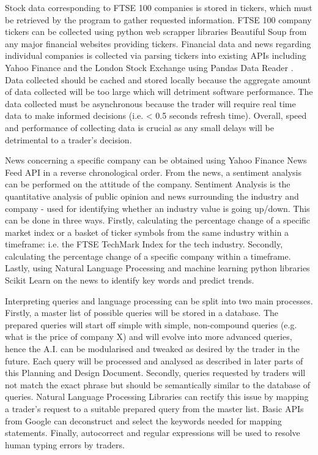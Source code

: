 \documentclass[]{IEEEtran}
\begin{document}
Stock data corresponding to FTSE 100 companies is stored in tickers, which must be retrieved by the program to gather requested information. FTSE 100 company tickers can be collected using python web scrapper libraries Beautiful Soup \cite{beauty} from any major financial websites providing tickers. Financial data and news regarding individual companies is collected via parsing tickers into existing APIs including Yahoo Finance and the London Stock Exchange using Pandas Data Reader \cite{panda}. Data collected should be cached and stored locally because the aggregate amount of data collected will be too large which will detriment software performance. The data collected must be asynchronous because the trader will require real time data to make informed decisions (i.e. < 0.5 seconds refresh time). Overall, speed and performance of collecting data is crucial as any small delays will be detrimental to a trader’s decision.

News concerning a specific company can be obtained using Yahoo Finance News Feed API in a reverse chronological order. From the news, a sentiment analysis can be performed on the attitude of the company. Sentiment Analysis is the quantitative analysis of public opinion and news surrounding the industry and company - used for identifying whether an industry value is going up/down. This can be done in three ways. Firstly, calculating the percentage change of a specific market index or a basket of ticker symbols from the same industry within a timeframe: i.e. the FTSE TechMark Index for the tech industry. Secondly, calculating the percentage change of a specific company within a timeframe. Lastly, using Natural Language Processing and machine learning python libraries Scikit Learn \cite{miks} on the news to identify key words and predict trends. 

Interpreting queries and language processing can be split into two main processes. Firstly, a master list of possible queries will be stored in a database. The prepared queries will start off simple with simple, non-compound queries (e.g. what is the price of company X) and will evolve into more advanced queries, hence the A.I. can be modularised and tweaked as desired by the trader in the future. Each query will be processed and analysed as described in later parts of this Planning and Design Document. Secondly, queries requested by traders will not match the exact phrase but should be semantically similar to the database of queries. Natural Language Processing Libraries \cite{spacy} \cite{tool} can rectify this issue by mapping a trader’s request to a suitable prepared query from the master list. Basic APIs from Google can deconstruct and select the keywords needed for mapping statements. Finally, autocorrect and regular expressions will be used to resolve human typing errors by traders.
\end{document}
